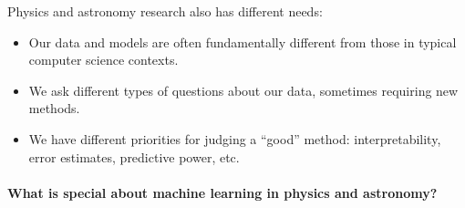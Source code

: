 \documentclass[%
oneside,                 %
final,                   %
10pt]{article}
\begin{document}
\noindent
Physics and astronomy research also has different needs:
\begin{itemize}
  \item Our data and models are often fundamentally different from those in typical computer science contexts.

  \item We ask different types of questions about our data, sometimes requiring new methods.

  \item We have different priorities for judging a ``good'' method: interpretability, error estimates, predictive power, etc.
\end{itemize}

\noindent
\paragraph{What is special about machine learning in physics and astronomy?}
\end{document}
